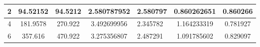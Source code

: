 \begin{table}[]
{\begin{tabular}{|c|c|c|c|l|c|c|}
2                                                                                          & 94.52152                                                                                                                                                                                                                       & 94.5212                                                                                                                                                                                                                      & 2.580787952                                                                                                                     & 2.580797                                                                                                                                              & 0.860262651                                                                                & 0.860266                                                                                   \\ \hline
4                                                                                          & 181.9578                                                                                                                                                                                                                       & 270.922                                                                                                                                                                                                                      & 3.492699956                                                                                                                     & 2.345782                                                                                                                                              & 1.164233319                                                                                & 0.781927                                                                                   \\ \hline
6                                                                                          & 357.616                                                                                                                                                                                                                        & 470.922                                                                                                                                                                                                                      & 3.275356807                                                                                                                     & 2.487291                                                                                                                                              & 1.091785602                                                                                & 0.829097                                                                                   \\ \hline

\end{tabular}}
\end{table}
